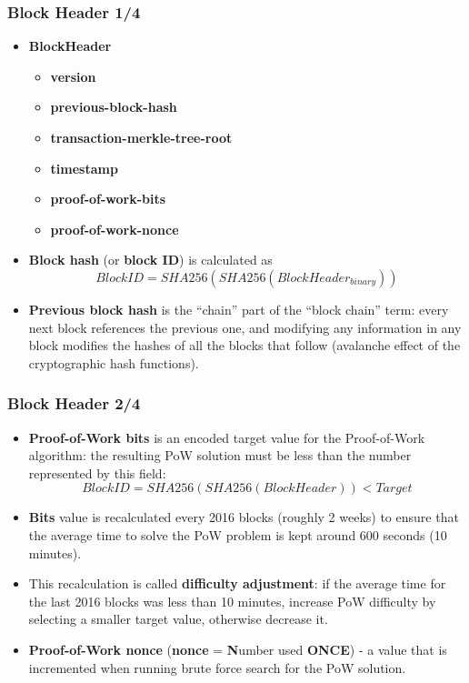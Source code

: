 \documentclass{beamer}
\begin{document}
\begin{frame}
  \frametitle{Block Header 1/4}
  \begin{itemize}
  \item \textbf{BlockHeader}
    \begin{itemize}
    \item \textbf{version}
    \item \textbf{previous-block-hash}
    \item \textbf{transaction-merkle-tree-root}
    \item \textbf{timestamp}
    \item \textbf{proof-of-work-bits}
    \item \textbf{proof-of-work-nonce}
    \end{itemize}
  \item \textbf{Block hash} (or \textbf{block ID}) is calculated as
    $$BlockID = SHA256(SHA256(BlockHeader_{binary}))$$
  \item \textbf{Previous block hash} is the ``chain'' part of the ``block
    chain'' term: every next block references the previous one, and modifying
    any information in any block modifies the hashes of all the blocks that
    follow (avalanche effect of the cryptographic hash functions).
  \end{itemize}
\end{frame}

\begin{frame}
  \frametitle{Block Header 2/4}
  \begin{itemize}
  \item \textbf{Proof-of-Work bits} is an encoded target value for the
    Proof-of-Work algorithm: the resulting PoW solution must be less than the
    number represented by this field:
    $$ BlockID = SHA256(SHA256(BlockHeader)) < Target$$
  \item \textbf{Bits} value is recalculated every 2016 blocks (roughly 2 weeks)
    to ensure that the average time to solve the PoW problem is kept around 600
    seconds (10 minutes).
  \item This recalculation is called \textbf{difficulty adjustment}: if the
    average time for the last 2016 blocks was less than 10 minutes, increase PoW
    difficulty by selecting a smaller target value, otherwise decrease it.
  \item \textbf{Proof-of-Work nonce} (\textbf{nonce} = \textbf{N}umber used
    \textbf{ONCE}) - a value that is incremented when running brute force search
    for the PoW solution.
  \end{itemize}
\end{frame}
\end{document}
